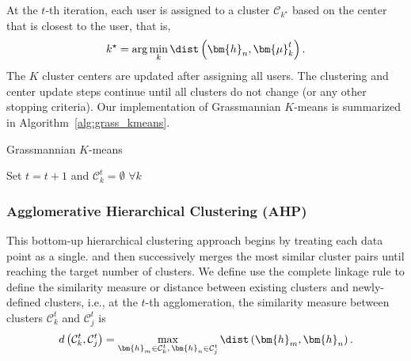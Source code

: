 At the $t$-th iteration, each user is assigned to 
a cluster $\mathcal{C}_{k^\star}$ based on the center that is closest to the user, that is,
\begin{equation}
	k^\star= \arg \mathop {\min }\limits_k \dist \left( {{{\bm{h}}_{n}} ,{\bm{\mu}}_k^t} \right).\label{eqn:assign}
\end{equation}
The $K$ cluster centers are updated after assigning all users. 
The clustering and center update steps continue until all clusters do not change (or any other stopping criteria). Our implementation of 
Grassmannian $K$-means is summarized in Algorithm~\ref{alg:grass_kmeans}.
\begin{algorithm}[H]
	\caption{Grassmannian $K$-means}
	\label{alg:grass_kmeans}
	\begin{algorithmic}[1]
		\State Set $t=t+1$ and $\mathcal{C}_k^t=\emptyset\,\,\forall k$
		\EndFor
		\EndFor
		\EndWhile
	\end{algorithmic}
\end{algorithm}

\subsubsection{Agglomerative Hierarchical Clustering (AHP)} 
This bottom-up hierarchical clustering approach
begins by treating each data point as a single. and then successively merges the most similar cluster pairs until reaching 
the target number of clusters. We define use the complete linkage rule \cite{Xu14} to define the similarity measure or distance between existing clusters and newly-defined clusters, i.e., at the $t$-th agglomeration, the similarity measure between clusters ${\mathcal{C}_k^t}$ and ${\mathcal{C}_j^t}$ is 
\begin{align}
	d \left( {{\mathcal{C}_k^t},{\mathcal{C}_j^t}} \right) = \max_{\bm{h}_m\in\mathcal{C}_k^t,\,\bm{h}_n\in\mathcal{C}_j^t} \dist \left( \bm{h}_m,\bm{h}_n \right) .\label{eqn:complete_linkage}
\end{align}

